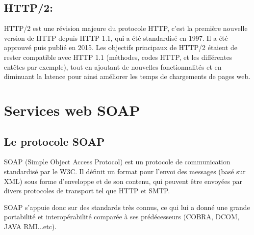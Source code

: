 \subsection{HTTP/2:}
HTTP/2 est une révision majeure du protocole HTTP, c'est la première nouvelle version de HTTP depuis HTTP 1.1, qui a été standardisé en 1997. Il a été approuvé puis publié en 2015.
Les objectifs principaux de HTTP/2 étaient de rester compatible avec HTTP 1.1 (méthodes, codes HTTP, et les différentes entêtes par exemple), tout en ajoutant de nouvelles fonctionnalités et en diminuant la latence pour ainsi améliorer les temps de chargements de pages web.

\newpage
\section{Services web SOAP} 
\subsection{Le protocole SOAP}
SOAP (Simple Object Access Protocol) est un protocole de communication standardisé par le W3C. 
Il définit un format pour l'envoi des messages (basé sur XML) sous forme d'enveloppe et de son contenu, qui peuvent être envoyées par divers protocoles de transport tel que HTTP et SMTP.
				
SOAP s'appuie donc sur des standards très connus, ce qui lui a donné une grande portabilité et interopérabilité comparée à ses prédécesseurs (COBRA, DCOM, JAVA RMI...etc).
				
